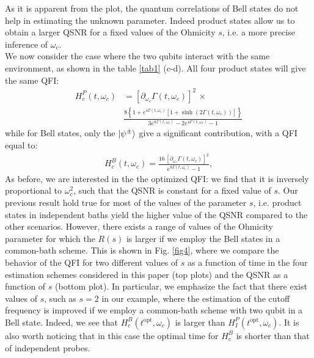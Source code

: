 \documentclass[ pra,a4paper,aps,twocolumn,superscriptaddress]{revtex4-1}
\def\ket#1{\mathinner{|{#1}\rangle}}
\def\tc#1{{\color{black}#1}}
\begin{document}
As it is apparent from the plot, the quantum correlations \tc{of Bell states} do not help in estimating the unknown parameter.
Indeed product states allow us to obtain a larger QSNR for a fixed values of the Ohmicity $s$, i.e. a 
more precise inference of $\omega_c$.
  \\
 We now consider the case where the two qubits interact with the same environment, as shown in the table \ref{tab1} (c-d).
 All four product states will give the same QFI:
\tc{  \begin{align}
 H_c^P(t,\omega_c)&=[\partial_{\omega_c}\Gamma(t,\omega_c)]^2\,\times\nonumber\\
&
 \frac{8\left\{1+e^{4\Gamma(t,\omega_c)}\left[1+\sinh(2\Gamma(t,\omega_c))\right]\right\}}
 {3 e^{8\Gamma(t,\omega_c)}-2e^{4\Gamma(t,\omega_c)}-1}
  \end{align}}
  while for Bell states, only the $\ket{\psi^{\pm}}$ give a significant contribution, with a QFI equal to:
\tc{\begin{align}
 H_c^B(t,\omega_c)= \frac{16\, \left[\partial_{\omega_c}\Gamma(t,\omega_c)\right]^2}{e^{8\Gamma(t,\omega_c)}-1},
 \end{align}}
As before, \tc{we are interested in the the optimized QFI: we find that it is inversely proportional to $\omega_c^2$, such that the QSNR is constant 
for a fixed value of $s$.}
\tc{Our previous result hold true for most of the values of the parameter $s$, i.e. product states in independent baths yield the higher value of the QSNR compared to the other scenarios. However, there exists a range of values of the Ohmicity parameter for which the $R(s)$ is larger if we employ the Bell states in a common-bath scheme. This is shown in Fig. \ref{fig4}, where we compare the behavior of the QFI for two different values of $s$ as a function of time in the four estimation schemes considered in this paper (top plots) and the QSNR as a function of $s$ (bottom plot). In particular, we emphasize the fact that there exist values of $s$, such as $s=2$ in our example, where the estimation of the cutoff frequency  is improved if we employ  a common-bath scheme  with two qubit in a Bell state. Indeed,  we see that $H^B_c(t^{\text{opt}},\omega_c)$ is larger than $H^P_I(t^{\text{opt}},\omega_c)$.
 It is also worth noticing that in this case the optimal time for $H^B_c$ is shorter than that of independent probes.   }
 
\end{document}
